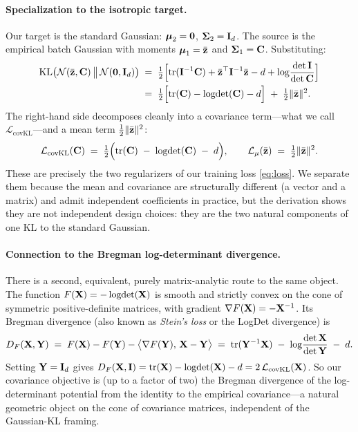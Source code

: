 \paragraph{Specialization to the isotropic target.}
Our target is the standard Gaussian: $\boldsymbol{\mu}_2 = \mathbf{0}$, $\boldsymbol{\Sigma}_2 = \mathbf{I}_d$. The source is the empirical batch Gaussian with moments $\boldsymbol{\mu}_1 = \bar{\mathbf{z}}$ and $\boldsymbol{\Sigma}_1 = \mathbf{C}$. Substituting:
\begin{align}
    \mathrm{KL}\!\left(\mathcal{N}(\bar{\mathbf{z}}, \mathbf{C}) \,\big\|\, \mathcal{N}(\mathbf{0}, \mathbf{I}_d)\right)
    &\;=\; \tfrac{1}{2}\Bigl[\operatorname{tr}(\mathbf{I}^{-1}\mathbf{C}) + \bar{\mathbf{z}}^\top \mathbf{I}^{-1} \bar{\mathbf{z}} - d + \log\!\frac{\det\mathbf{I}}{\det\mathbf{C}}\Bigr] \notag\\
    \label{eq:full_kl}
    &\;=\; \tfrac{1}{2}\Bigl[\operatorname{tr}(\mathbf{C}) - \operatorname{logdet}(\mathbf{C}) - d\Bigr] \;+\; \tfrac{1}{2}\|\bar{\mathbf{z}}\|^2.
\end{align}
The right-hand side decomposes cleanly into a covariance term---what we call $\mathcal{L}_\text{covKL}$---and a mean term $\tfrac{1}{2}\|\bar{\mathbf{z}}\|^2$:
\begin{equation}
\label{eq:covkl_derived}
    \mathcal{L}_\text{covKL}(\mathbf{C}) \;=\; \tfrac{1}{2}\Bigl(\operatorname{tr}(\mathbf{C}) \;-\; \operatorname{logdet}(\mathbf{C}) \;-\; d\Bigr),
    \qquad
    \mathcal{L}_\mu(\bar{\mathbf{z}}) \;=\; \tfrac{1}{2}\|\bar{\mathbf{z}}\|^2.
\end{equation}
These are precisely the two regularizers of our training loss \eqref{eq:loss}. We separate them because the mean and covariance are structurally different (a vector and a matrix) and admit independent coefficients in practice, but the derivation shows they are not independent design choices: they are the two natural components of one KL to the standard Gaussian.

\paragraph{Connection to the Bregman log-determinant divergence.}
There is a second, equivalent, purely matrix-analytic route to the same object. The function $F(\mathbf{X}) = -\operatorname{logdet}(\mathbf{X})$ is smooth and strictly convex on the cone of symmetric positive-definite matrices, with gradient $\nabla F(\mathbf{X}) = -\mathbf{X}^{-1}$. Its Bregman divergence (also known as \emph{Stein's loss} or the LogDet divergence) is
\begin{equation}
    D_F(\mathbf{X}, \mathbf{Y}) \;=\; F(\mathbf{X}) - F(\mathbf{Y}) - \bigl\langle \nabla F(\mathbf{Y}),\, \mathbf{X} - \mathbf{Y}\bigr\rangle
    \;=\; \operatorname{tr}(\mathbf{Y}^{-1}\mathbf{X}) \;-\; \log\!\frac{\det\mathbf{X}}{\det\mathbf{Y}} \;-\; d.
\end{equation}
Setting $\mathbf{Y} = \mathbf{I}_d$ gives $D_F(\mathbf{X}, \mathbf{I}) = \operatorname{tr}(\mathbf{X}) - \operatorname{logdet}(\mathbf{X}) - d = 2\,\mathcal{L}_\text{covKL}(\mathbf{X})$. So our covariance objective is (up to a factor of two) the Bregman divergence of the log-determinant potential from the identity to the empirical covariance---a natural geometric object on the cone of covariance matrices, independent of the Gaussian-KL framing.

